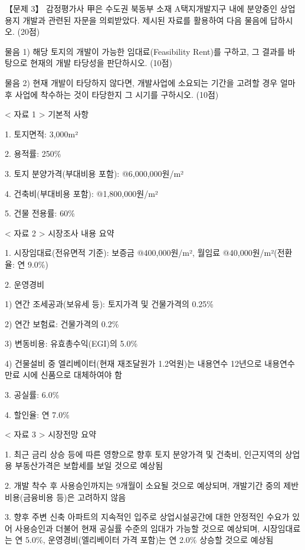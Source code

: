 \begin{longquestion}{【문제 3】}
감정평가사 甲은 수도권 북동부 소재 A택지개발지구 내에 분양중인 상업용지 개발과 관련된 자문을 의뢰받았다. 제시된 자료를 활용하여 다음 물음에 답하시오. (20점) \par
\medskip\noindent 물음 1) 해당 토지의 개발이 가능한 임대료(Feasibility Rent)를 구하고, 그 결과를 바탕으로 현재의 개발 타당성을 판단하시오. (10점) \par
\medskip\noindent 물음 2) 현재 개발이 타당하지 않다면, 개발사업에 소요되는 기간을 고려할 경우 얼마 후 사업에 착수하는 것이 타당한지 그 시기를 구하시오. (10점) \par
< 자료 1 > 기본적 사항 \par
1. 토지면적: 3,000m² \par
2. 용적률: 250\% \par
3. 토지 분양가격(부대비용 포함): @6,000,000원/m² \par
4. 건축비(부대비용 포함): @1,800,000원/m² \par
5. 건물 전용률: 60\% \par
< 자료 2 > 시장조사 내용 요약 \par
1. 시장임대료(전유면적 기준): 보증금 @400,000원/m², 월임료 @40,000원/m²(전환율: 연 9.0\%) \par
2. 운영경비 \par
1) 연간 조세공과(보유세 등): 토지가격 및 건물가격의 0.25\% \par
2) 연간 보험료: 건물가격의 0.2\% \par
3) 변동비용: 유효총수익(EGI)의 5.0\% \par
4) 건물설비 중 엘리베이터(현재 재조달원가 1.2억원)는 내용연수 12년으로 내용연수 만료 시에 신품으로 대체하여야 함 \par
3. 공실률: 6.0\% \par
4. 할인율: 연 7.0\% \par
< 자료 3 > 시장전망 요약 \par
1. 최근 금리 상승 등에 따른 영향으로 향후 토지 분양가격 및 건축비, 인근지역의 상업용 부동산가격은 보합세를 보일 것으로 예상됨 \par
2. 개발 착수 후 사용승인까지는 9개월이 소요될 것으로 예상되며, 개발기간 중의 제반비용(금융비용 등)은 고려하지 않음 \par
3. 향후 주변 신축 아파트의 지속적인 입주로 상업시설공간에 대한 안정적인 수요가 있어 사용승인과 더불어 현재 공실률 수준의 임대가 가능할 것으로 예상되며, 시장임대료는 연 5.0\%, 운영경비(엘리베이터 가격 포함)는 연 2.0\% 상승할 것으로 예상됨 \par
\end{longquestion}
